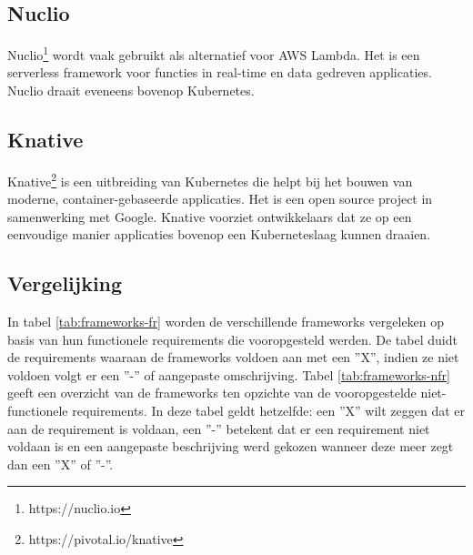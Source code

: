 \subsection{Nuclio}
Nuclio\footnote{https://nuclio.io} wordt vaak gebruikt als alternatief voor AWS Lambda. Het is een serverless framework voor functies in real-time en data gedreven applicaties. Nuclio draait eveneens bovenop Kubernetes. \autocite{Nuclio2019}

\subsection{Knative}
Knative\footnote{https://pivotal.io/knative} is een uitbreiding van Kubernetes die helpt bij het bouwen van moderne, container-gebaseerde applicaties. Het is een open source project in samenwerking met Google. Knative voorziet ontwikkelaars dat ze op een eenvoudige manier applicaties bovenop een Kuberneteslaag kunnen draaien.

\subsection{Vergelijking}
In tabel \ref{tab:frameworks-fr} worden de verschillende frameworks vergeleken op basis van hun functionele requirements die vooropgesteld  werden.  De tabel duidt de requirements waaraan de frameworks voldoen aan met een ''X'', indien ze niet voldoen volgt er een ''-'' of aangepaste omschrijving. Tabel \ref{tab:frameworks-nfr} geeft een overzicht van de frameworks ten opzichte van de vooropgestelde niet-functionele requirements. In deze tabel geldt hetzelfde: een ''X'' wilt zeggen dat er aan de requirement is voldaan, een ''-'' betekent dat er een requirement niet voldaan is en een aangepaste beschrijving werd gekozen wanneer deze meer zegt dan een ''X'' of ''-''.


